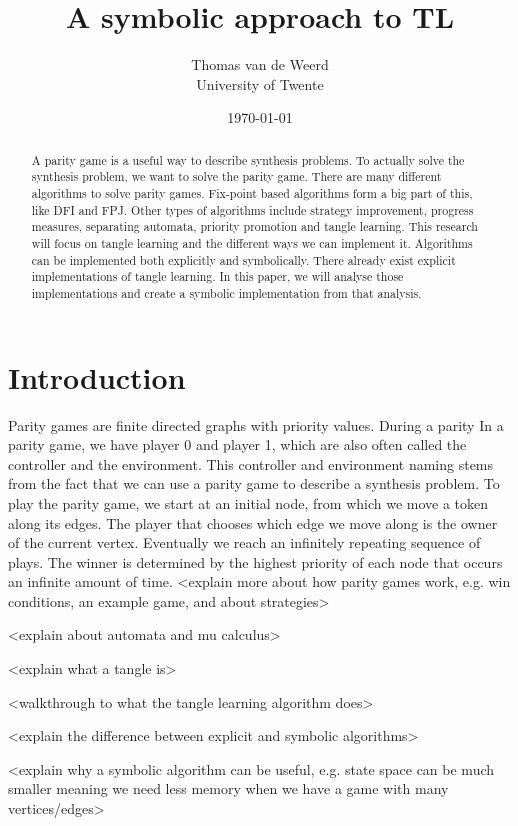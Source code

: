 \documentclass[11pt, a4paper]{article}
\title{A symbolic approach to TL}
\author{Thomas van de Weerd \\ \small University of Twente}
\date{\today}
\begin{document}
\maketitle

\begin{abstract}
A parity game is a useful way to describe synthesis problems. To actually solve the synthesis problem, we want to solve the parity game.
There are many different algorithms to solve parity games. Fix-point based algorithms form a big part of this, like DFI and FPJ. 
Other types of algorithms include strategy improvement, progress measures, separating automata, priority promotion and tangle learning.
This research will focus on tangle learning and the different ways we can implement it. 
Algorithms can be implemented both explicitly and symbolically. 
There already exist explicit implementations of tangle learning. In this paper, we will analyse those implementations and create a symbolic implementation from that analysis.
\end{abstract}

\section{Introduction}
\label{sec:intro}
Parity games are finite directed graphs with priority values. During a parity
In a parity game, we have player 0 and player 1, which are also often called the controller and the environment.
This controller and environment naming stems from the fact that we can use a parity game to describe a synthesis problem.
To play the parity game, we start at an initial node, from which we move a token along its edges. The player that chooses which edge we move along is the owner of the current vertex.
Eventually we reach an infinitely repeating sequence of plays. The winner is determined by the highest priority of each node that occurs an infinite amount of time.
<explain more about how parity games work, e.g. win conditions, an example game, and about strategies>


<explain about automata and mu calculus>


<explain what a tangle is>


<walkthrough to what the tangle learning algorithm does>


<explain the difference between explicit and symbolic algorithms>


<explain why a symbolic algorithm can be useful, e.g. state space can be much smaller meaning we need less memory when we have a game with many vertices/edges>
\end{document}

